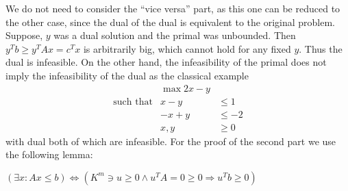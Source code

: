 \documentclass{scrartcl}
\newcommand\1{\mathbf{1}}
\begin{document}
We do not need to consider the \enquote{vice versa} part, as this one can be reduced to the other case, since the dual of the dual is equivalent to the original problem. Suppose, $y$ was a dual solution and the primal was unbounded. Then $y^Tb \ge y^TAx = c^T x$ is arbitrarily big, which cannot hold for any fixed $y$. Thus the dual is infeasible. On the other hand, the infeasibility of the primal does not imply the infeasibility of the dual as the classical example
\begin{alignat*}
 &\max 2x-y \\
\text{such that} & x-y &\le 1 \\
&-x+y &\le -2 \\
&x,y &\ge 0
\end{alignat*}
with dual
both of which are infeasible. For the proof of the second part we use the following lemma:
\begin{Lemma}[Farkas]
$(\exists x \colon  Ax \le b) \Leftrightarrow (K^m \ni u \ge 0\wedge u^TA=0 \ge 0 \Rightarrow u^Tb \ge 0)$
\end{Lemma}
\end{document}
